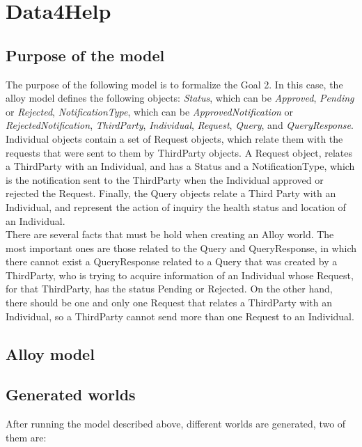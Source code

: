\documentclass[a4paper, hidelinks, 12pt]{report}
\begin{document}
	\section{Data4Help}
	\subsection{Purpose of the model}
	The purpose of the following model is to formalize the Goal 2. In this case, the alloy model defines the following objects: \textit{Status}, which can be \textit{Approved}, \textit{Pending} or \textit{Rejected}, \textit{NotificationType}, which can be \textit{ApprovedNotification} or \textit{RejectedNotification}, \textit{ThirdParty}, \textit{Individual}, \textit{Request}, \textit{Query}, and \textit{QueryResponse}. Individual objects contain a set of Request objects, which relate them with the requests that were sent to them by ThirdParty objects. A Request object, relates a ThirdParty with an Individual, and has a Status and a NotificationType, which is the notification sent to the ThirdParty when the Individual approved or rejected the Request. Finally, the Query objects relate a Third Party with an Individual, and represent the action of inquiry the health status and location of an Individual.\\

	There are several facts that must be hold when creating an Alloy world. The most important ones are those related to the Query and QueryResponse, in which there cannot exist a QueryResponse related to a Query that was created by a ThirdParty, who is trying to acquire information of an Individual whose Request, for that ThirdParty, has the status Pending or Rejected. On the other hand, there should be one and only one Request that relates a ThirdParty with an Individual, so a ThirdParty cannot send more than one Request to an Individual.
	
	\subsection{Alloy model}
	\vspace{2 mm}
	
	
	
	\vspace{8 mm}
	
	\subsection{Generated worlds}
	After running the model described above, different worlds are generated, two of them are:
	
\end{document}
